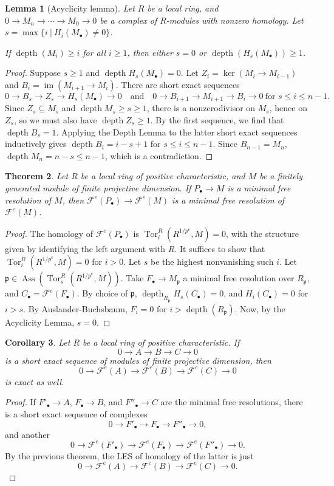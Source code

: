 \documentclass[11pt]{book}
\newtheorem{theorem}{Theorem}[chapter]
\newtheorem{lemma}[theorem]{Lemma}
\newtheorem{corollary}[theorem]{Corollary}
\numberwithin{equation}{section}
\numberwithin{theorem}{chapter}
\theoremstyle{definition}
\newtheorem*{basic properties}{Basic Properties}
\newtheorem*{Important Remark}{Important Remark}
\theoremstyle{remark}
\newcommand{\p}{\mathfrak{p}}
\newcommand{\cF}{\mathcal{F}}
\newcommand{\Tor}{\operatorname{Tor}}
\renewcommand{\ker}{\operatorname{ker}}
\newcommand{\Ass}{\operatorname{Ass}}
\DeclareMathOperator{\im}{im}
\newcommand{\depth}{\operatorname{depth}}
\begin{document}
\begin{lemma}[Acyclicity lemma]
	Let $R$ be a local ring, and $0\to M_n \to \cdots \to M_0 \to 0$ be a complex of $R$-modules with nonzero homology. Let $s=\max\{ i \  | \ H_i(M_\bullet)\neq 0\}$.
	
	If $\depth(M_i)\geq i$ for all $i\geq 1$, then either $s=0$ or $\depth(H_s(M_\bullet))\geq 1$.
\end{lemma}
\begin{proof}
	Suppose $s\geq 1$ and $\depth H_s(M_\bullet)=0$. Let $Z_i=\ker(M_i\to M_{i-1})$ and $B_i=\im (M_{i+1}\to M_i)$. There are short exact sequences 
	\[ 0 \to B_s \to Z_s \to H_s(M_\bullet)\to 0 \quad \text{and} \quad 0 \to B_{i+1} \to M_{i+1} \to B_i\to 0 \ \text{for $s\leq i \leq n-1$}.\]
	Since $Z_s\subseteq M_s$ and $\depth M_s \geq s\geq 1$, there is a nonzerodivisor on $M_s$, hence on $Z_s$, so we must also have $\depth Z_s \geq 1$. By the first sequence, we find that $\depth B_s =1$. Applying the Depth Lemma to the latter short exact sequences inductively gives $\depth B_i = i - s + 1$ for $s\leq i\leq n-1$. Since $B_{n-1}=M_n$, $\depth M_n = n-s \leq n-1$, which is a contradiction.
\end{proof}

\begin{theorem}
	Let $R$ be a local ring of positive characteristic, and $M$ be a finitely generated module of finite projective dimension. If $P_\bullet \to M$ is a minimal free resolution of $M$, then $\cF^e(P_\bullet)\to \cF^e(M)$ is a minimal free resolution of $\cF^e(M)$.
\end{theorem}
\begin{proof} The homology of $\cF^e(P_\bullet)$ is $\Tor^R_i(R^{1/p^e},M)=0$, with the structure given by identifying the left argument with $R$.
	It suffices to show that $\Tor^R_i(R^{1/p^e},M)=0$ for $i>0$. Let $s$ be the highest nonvanishing such $i$. Let $\p\in \Ass(\Tor^R_s(R^{1/p^e},M))$. Take $F_\bullet\to M_\p$ a minimal free resolution over $R_\p$, and $C_\bullet=\cF^e(F_\bullet)$. By choice of $\p$, $\depth_{R_\p} H_s(C_\bullet) =0$, and $H_i(C_\bullet)=0$ for $i>s$. By Auslander-Buchsbaum, $F_i=0$ for $i>\depth(R_\p)$. Now, by the Acyclicity Lemma, $s=0$.
\end{proof}

\begin{corollary}
	Let $R$ be a local ring of positive characteristic. If
	\[ 0 \to A \to B \to C \to 0 \]
	is a short exact sequence of modules of finite projective dimension, then
	\[ 0 \to \cF^e(A)\to \cF^e(B) \to \cF^e(C) \to 0\]
	is exact as well.
\end{corollary}
\begin{proof}
	If $F'_\bullet\to A$, $F_\bullet\to B$, and $F''_\bullet \to C$ are the minimal free resolutions, there is a short exact sequence of complexes 
	\[0\to F'_\bullet \to F_\bullet \to F''_\bullet \to 0,\] and another 
	\[0\to \cF^e(F'_\bullet) \to \cF^e(F_\bullet) \to \cF^e(F''_\bullet) \to 0.\]
	By the previous theorem, the LES of homology of the latter is just
	\[ 0 \to \cF^e(A)\to \cF^e(B) \to \cF^e(C) \to 0.\]\qedhere
\end{proof}
\end{document}
